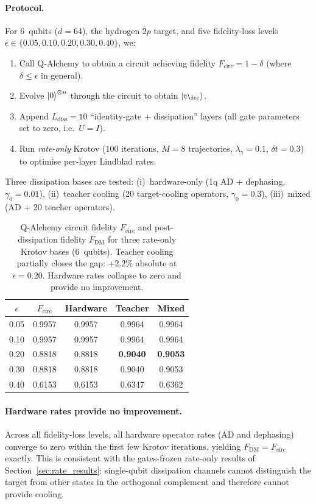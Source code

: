 \documentclass[11pt,a4paper]{article}
\begin{document}
\paragraph{Protocol.}
For 6~qubits ($d = 64$), the hydrogen $2p$ target, and five fidelity-loss
levels $\epsilon \in \{0.05, 0.10, 0.20, 0.30, 0.40\}$, we:
\begin{enumerate}[nosep]
\item Call Q-Alchemy to obtain a circuit achieving fidelity
  $F_\text{circ} = 1 - \delta$ (where $\delta \le \epsilon$ in
  general).
\item Evolve $\ket{0}^{\otimes n}$ through the circuit to obtain
  $\ket{\psi_\text{circ}}$.
\item Append $L_\text{diss} = 10$ ``identity-gate + dissipation''
  layers (all gate parameters set to zero, i.e.\ $U = I$).
\item Run \emph{rate-only} Krotov ($100$ iterations, $M = 8$
  trajectories, $\lambda_\gamma = 0.1$, $\delta t = 0.3$) to
  optimise per-layer Lindblad rates.
\end{enumerate}
Three dissipation bases are tested:
(i)~hardware-only (1q AD + dephasing, $\gamma_0 = 0.01$),
(ii)~teacher cooling (20 target-cooling operators, $\gamma_0 = 0.3$),
(iii)~mixed (AD + 20 teacher operators).

\begin{table}[ht]
\centering
\begin{tabular}{@{}ccccc@{}}
\toprule
$\epsilon$ & $F_\text{circ}$ & Hardware & Teacher & Mixed \\
\midrule
0.05 & 0.9957 & 0.9957 & 0.9964 & 0.9964 \\
0.10 & 0.9957 & 0.9957 & 0.9964 & 0.9964 \\
0.20 & 0.8818 & 0.8818 & \textbf{0.9040} & \textbf{0.9053} \\
0.30 & 0.8818 & 0.8818 & 0.9040 & 0.9053 \\
0.40 & 0.6153 & 0.6153 & 0.6347 & 0.6362 \\
\bottomrule
\end{tabular}
\caption{%
Q-Alchemy circuit fidelity $F_\text{circ}$ and post-dissipation
fidelity $F_\text{DM}$ for three rate-only Krotov bases (6~qubits).
Teacher cooling partially closes the gap: $+2.2\%$ absolute at
$\epsilon = 0.20$.  Hardware rates collapse to zero and provide
no improvement.
}
\label{tab:qalchemy}
\end{table}

\paragraph{Hardware rates provide no improvement.}
Across all fidelity-loss levels, all hardware operator rates (AD and
dephasing) converge to zero within the first few Krotov iterations,
yielding $F_\text{DM} = F_\text{circ}$ exactly.  This is consistent
with the gates-frozen rate-only results of
Section~\ref{sec:rate_results}: single-qubit dissipation channels
cannot distinguish the target from other states in the orthogonal
complement and therefore cannot provide cooling.
\end{document}
